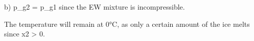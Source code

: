 b) p_g2 = p_g1 since the EW mixture is incompressible.

The temperature will remain at 0°C, as only a certain amount of the ice melts since x2 > 0.